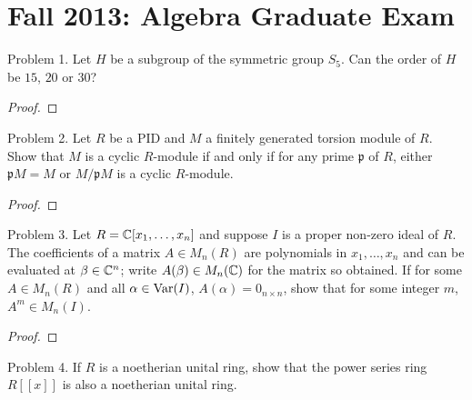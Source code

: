 \documentclass{article}
\begin{document}
\section{Fall 2013: Algebra Graduate Exam}
\begin{subsection}{Problem 1.}
  Let $H$ be a subgroup of the symmetric group $S_5$. Can the order of $H$ be
  $15$, $20$ or $30$?
\end{subsection}

\begin{proof}
\end{proof}
\pagebreak

\begin{subsection}{Problem 2.}
  Let $R$ be a PID and $M$ a finitely generated torsion module of $R$. Show that
  $M$ is a cyclic $R$-module if and only if for any prime $\mathfrak p$ of $R$,
  either $\mathfrak pM = M$ or $M/\mathfrak pM$ is a cyclic $R$-module.
\end{subsection}

\begin{proof}
\end{proof}
\pagebreak

\begin{subsection}{Problem 3.}
  Let $R = \mathbb C[x_1, \hdots, x_n]$ and suppose $I$ is a proper non-zero ideal of
  $R$. The coefficients of a matrix $A \in M_n(R)$ are polynomials in
  $x_1, \hdots, x_n$ and can be evaluated at $\beta \in \mathbb C^n$; write
  $A(\beta) \in M_n(\mathbb C)$ for the matrix so obtained. If for some $A \in M_n(R)$
  and all $\alpha \in \operatorname{Var}(I)$, $A(\alpha) = 0_{n\times n}$, show that for some
  integer $m$, $A^m \in M_n(I)$.
\end{subsection}

\begin{proof}
\end{proof}
\pagebreak

\begin{subsection}{Problem 4.}
  If $R$ is a noetherian unital ring, show that the power series ring $R[[x]]$
  is also a noetherian unital ring.
\end{subsection}
\end{document}

